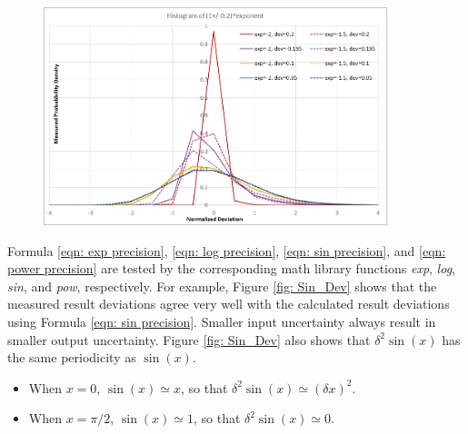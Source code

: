 \documentclass[twoside]{article}
\numberwithin{equation}{section}
\begin{document}
\begin{figure}[p]
\centering
\includegraphics[height=2.5in]{Pow_Histogram.png} 
\label{fig: Pow_Histogram}
\end{figure}


Formula \eqref{eqn: exp precision}, \eqref{eqn: log precision}, \eqref{eqn: sin precision}, and \eqref{eqn: power precision} are tested by the corresponding math library functions \textit{exp}, \textit{log}, \textit{sin}, and \textit{pow}, respectively.
For example, Figure \ref{fig: Sin_Dev} shows that the measured result deviations agree very well with the calculated result deviations using Formula \eqref{eqn: sin precision}.
Smaller input uncertainty always result in smaller output uncertainty.
Figure \ref{fig: Sin_Dev} also shows that $\delta^2 \sin(x)$ has the same periodicity as $\sin(x)$.
\begin{itemize}
\item When $x=0$, $\sin(x) \simeq x$, so that $\delta^2 \sin(x) \simeq (\delta x)^2$.
\item When $x=\pi/2$, $\sin(x) \simeq 1$, so that $\delta^2 \sin(x) \simeq 0$.
\end{itemize}
\end{document}
